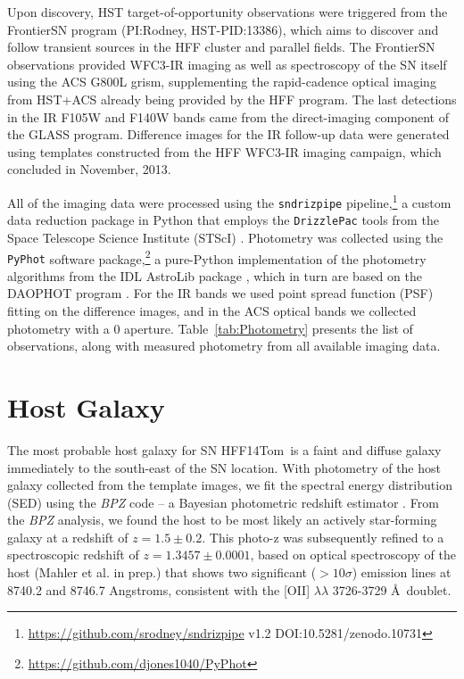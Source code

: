 \documentclass[iop]{emulateapj}
\def\tomas{HFF14Tom}
\begin{document}


Upon discovery, HST target-of-opportunity observations were triggered
from the FrontierSN program (PI:Rodney, HST-PID:13386), which aims to
discover and follow transient sources in the HFF cluster and parallel
fields. The FrontierSN observations provided WFC3-IR imaging as well
as spectroscopy of the SN itself using the ACS G800L grism,
supplementing the rapid-cadence optical imaging from HST+ACS already
being provided by the HFF program. The last detections in the IR F105W
and F140W bands came from the direct-imaging component of the GLASS
program.  Difference images for the IR follow-up data were generated
using templates constructed from the HFF WFC3-IR imaging campaign,
which concluded in November, 2013.

All of the imaging data were processed using the {\tt sndrizpipe}
pipeline,\footnote{\url{https://github.com/srodney/sndrizpipe} v1.2
DOI:10.5281/zenodo.10731} a custom data reduction package in Python
that employs the {\tt DrizzlePac} tools from the Space Telescope
Science Institute (STScI) \citep{Fruchter:2010}.  Photometry was
collected using the {\tt PyPhot} software
package,\footnote{\url{https://github.com/djones1040/PyPhot}} a
pure-Python implementation of the photometry algorithms from the IDL
AstroLib package \citep{Landsman:1993}, which in turn are based on the
DAOPHOT program \citep{Stetson:1987}.  For the IR bands we used point
spread function (PSF) fitting on the difference images, and in the ACS
optical bands we collected photometry with a
0 aperture. Table~\ref{tab:Photometry} presents the list of
observations, along with measured photometry from all available
imaging data.

\section{Host Galaxy}
\label{sec:HostGalaxy}

The most probable host galaxy for SN \tomas\ is a faint and diffuse
galaxy immediately to the south-east of the SN location.  With
photometry of the host galaxy collected from the template images, we
fit the spectral energy distribution (SED) using the {\it BPZ} code --
a Bayesian photometric redshift estimator \citep{Benitez:2000}. 
From the {\it BPZ} analysis, we found the host to be most likely an
actively star-forming galaxy at a redshift of
$z=1.5\pm0.2$.  This photo-z was subsequently refined to a
spectroscopic redshift of $z=1.3457\pm0.0001$, based on optical
spectroscopy of the host (Mahler et al. in prep.) that shows two
significant ($>10\sigma$) emission lines at 8740.2 and 8746.7
Angstroms, consistent with the [OII] $\lambda\lambda$ 3726-3729 \AA\
doublet.  
\end{document}
